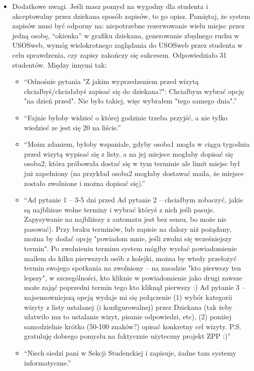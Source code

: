 \documentclass[licencjacka]{pracamgr}
\begin{document}
\begin{itemize}
\item Dodatkowe uwagi. Jeśli masz pomysł na wygodny dla studenta i akceptowalny przez dziekana sposób zapisów, to go opisz. Pamiętaj, że system zapisów musi być odporny na: niepotrzebne rezerwowanie wielu miejsc przez jedną osobę, \enquote{okienka} w grafiku dziekana, generowanie zbędnego ruchu w USOSweb, wymóg wielokrotnego zaglądania do USOSweb przez studenta w celu sprawdzenia, czy zapisy zakończy się sukcesem.
Odpowiedziało 31 studentów. Między innymi tak:
\begin{itemize}
\setlength\itemsep{0,05em}
\item \enquote{Odnośnie pytania "Z jakim wyprzedzeniem przed wizytą chciałbyś/chciałabyś zapisać się do dziekana?":    Chciałbym wybrać opcję "na dzień przed". Nie było takiej, więc wybrałem "tego samego dnia".}
\item \enquote{Fajnie byłoby widzieć o której godzinie trzeba przyjść, a nie tylko wiedzieć ze jest się 20 na liście.}
\item \enquote{Moim zdaniem, byłoby wspaniale, gdyby osoba1 mogła w ciągu tygodnia przed wizytą wypisać się z listy, a na jej miejsce mogłaby dopisać się osoba2, która próbowała dostać się w tym terminie ale limit miejsc był już zapełniony (na przykład osoba2 mogłaby dostawać maila, że miejsce zostało zwolnione i można dopisać się).}
\item \enquote{Ad pytanie 1 -- 3-5 dni przed    Ad pytanie 2 -- chciałbym zobaczyć, jakie są najbliższe wolne terminy i wybrać któryś z nich jeśli pasuje. Zapysywanie na najbliższy z automatu jest bez sensu, bo może nie pasować). Przy braku terminów, lub zapisie na dalszy niż pożądany, można by dodać opcję "powiadom mnie, jeśli zwolni się wcześniejszy termin". Po zwolnieniu terminu system mógłby wysłać powiadomienie mailem do kilku pierwszych osób z kolejki, można by wtedy przełożyć termin swojego spotkania na zwolniony -- na zasadzie "kto pierwszy ten lepszy", w szczególności, kto kliknie w powiadomienie jako drugi zawsze może zająć poprzedni termin tego kto kliknął pierwszy :)    Ad pytanie 3 -- najsensowniejszą opcją wydaje mi się połączenie    (1) wybór kategorii wizyty z listy ustalanej (i konfigurowalnej) przez Dziekana (tak żeby ułatwiło mu to ustalanie wizyt, pisanie odpowiedzi, etc),    (2) poniżej samodzielnie krótko (50-100 znaków?) opisać konkretny cel wizyty.    P.S. gratuluję dobrego pomysłu na faktycznie użyteczny projekt ZPP :)}
\item \enquote{Niech siedzi pani w Sekcji Studenckiej i zapisuje, żadne tam systemy informatyczne.}

\end{itemize}
\end{itemize}
\end{document}
